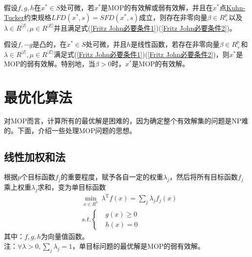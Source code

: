     \begin{theorem}[KKT必要条件]
    假设$f,g,h$在$x^*\in S$处可微，若$x^*$是MOP的有效解或弱有效解，并且在$x^*$点\underline{Kuhn-Tucker}约束规格$LFD(x^*,s)=SFD(x^*,s)$成立，则存在非零向量$\beta \in R_{+}^p$以及${\lambda} \in R^{|I|},\mu \in R^{|E|}$并且满足式(\ref{Fritz John必要条件1})(\ref{Fritz John必要条件2})。
    \end{theorem}
    \begin{theorem}[KKT充分条件]
    假设$f,-g$是凸的，在$x^*\in S$处可微，并且$h$是线性函数，若存在非零向量$\beta \in R_{+}^p$和${\lambda} \in R^{|I|},\mu \in R^{|E|}$满足式(\ref{Fritz John必要条件1})(\ref{Fritz John必要条件2})，则$x^*$是MOP的弱有效解。特别地，当$\beta > 0$时，$x^*$是MOP的有效解。
    \end{theorem}

\section{最优化算法}
    对MOP而言，计算所有的最优解是困难的，因为确定整个有效解集的问题是NP难的。下面，介绍一些处理MOP问题的思想。
    \subsection{线性加权和法}
        \par
        根据$p$个目标函数$f_j$的重要程度，赋予各自一定的权重${\lambda}_j$，然后将所有目标函数$f_j$乘上权重${\lambda}_j$求和，变为单目标函数
            \begin{align*}
              & \mathop{\min}\limits_{x\in R^n} \ {\lambda}^\mathrm{T} f(x)=\mathop{\sum}\limits_{j} {\lambda}_jf_j(x)\\
              & s.t.\left\{
                \begin{aligned}
              & g(x)\geqslant 0\\
              & h(x)=0
                \end{aligned}
                 \right.
            \end{align*}
        其中：$f,g,h$为向量值函数。\\
        注：$\forall \lambda >0,\mathop{\sum}\limits_{j} {\lambda}_j=1$，单目标问题的最优解是MOP的弱有效解。
